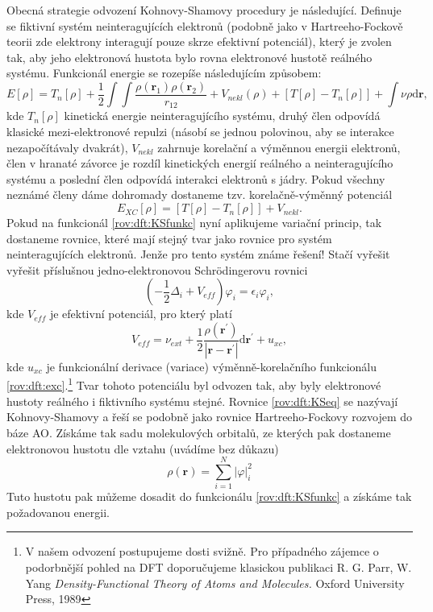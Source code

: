 Obecná strategie odvození Kohnovy-Shamovy procedury je následující. Definuje se fiktivní systém neinteragujících elektronů (podobně jako v Hartreeho-Fockově teorii zde elektrony interagují pouze skrze efektivní potenciál), který je zvolen tak, aby jeho elektronová hustota bylo rovna elektronové hustotě reálného systému. 
Funkcionál energie se rozepíše následujícím způsobem:
\begin{equation}
E[\rho]= T_{n}[\rho] + \frac{1}{2}\int \int \frac{\rho(\textbf{r}_1)\rho(\textbf{r}_2)}{r_{12}} + V_{nekl}(\rho) +\left[T[\rho]-T_{n}[\rho]\right] + \int \nu \rho \mathrm{d}\textbf{r},
\label{rov:dft:KSfunkc}
\end{equation}
kde $T_{n}[\rho]$ kinetická energie neinteragujícího systému, druhý člen odpovídá klasické mezi-elektronové repulzi (násobí se jednou polovinou, aby se interakce nezapočítávaly dvakrát), $V_{nekl}$ zahrnuje korelační a výměnnou energii elektronů, člen v hranaté závorce je rozdíl kinetických energií reálného a neinteragujícího systému  a poslední člen odpovídá interakci elektronů s jádry. Pokud všechny neznámé členy dáme dohromady dostaneme tzv. korelačně-výměnný potenciál
\begin{equation}	
E_{XC}[\rho]=\left[T[\rho]-T_{n}[\rho]\right] +  V_{nekl} .
\label{rov:dft:exc}
\end{equation}
Pokud na funkcionál \eqref{rov:dft:KSfunkc} nyní aplikujeme variační princip, tak dostaneme rovnice, které mají stejný tvar jako rovnice
pro systém neinteragujících elektronů. Jenže pro tento systém známe řešení! Stačí vyřešit vyřešit příslušnou jedno-elektronovou  	 Schr\"{o}dingerovu rovnici
\begin{equation}
\left(-\frac{1}{2}\Delta_i + V_{eff} \right) \varphi_i =\epsilon_i \varphi_i ,
\label{rov:dft:KSeq}
\end{equation}
kde $V_{eff}$ je efektivní potenciál, pro který platí
\begin{equation}
V_{eff}=\nu_{ext}+\frac{1}{2}\frac{\rho(\textbf{r}^{\prime})}{|\textbf{r}-\textbf{r}^{\prime}|}\mathrm{d}\textbf{r}^{\prime}+u_{xc} ,
\end{equation}
kde $u_{xc}$ je funkcionální derivace (variace) výměnně-korelačního funkcionálu \ref{rov:dft:exc}.\footnote{V našem odvození postupujeme dosti svižně. Pro případného zájemce o podorbnější pohled na DFT doporučujeme klasickou publikaci R. G. Parr, W. Yang \textit{Density-Functional Theory of Atoms and Molecules.} Oxford University Press, 1989} Tvar tohoto potenciálu byl odvozen tak, aby byly elektronové hustoty reálného i fiktivního systému stejné.
Rovnice \ref{rov:dft:KSeq} se nazývají Kohnovy-Shamovy a řeší se podobně jako rovnice Hartreeho-Fockovy rozvojem do báze AO.
Získáme tak sadu molekulových orbitalů, ze kterých pak dostaneme elektronovou hustotu dle vztahu (uvádíme bez důkazu)
\begin{equation}
\rho(\textbf{r}) = \sum_{i=1}^N |\varphi|_i^2
\label{rov:dft:KSrho}
\end{equation}
Tuto hustotu pak můžeme dosadit do funkcionálu \eqref{rov:dft:KSfunkc} a získáme tak požadovanou energii.

